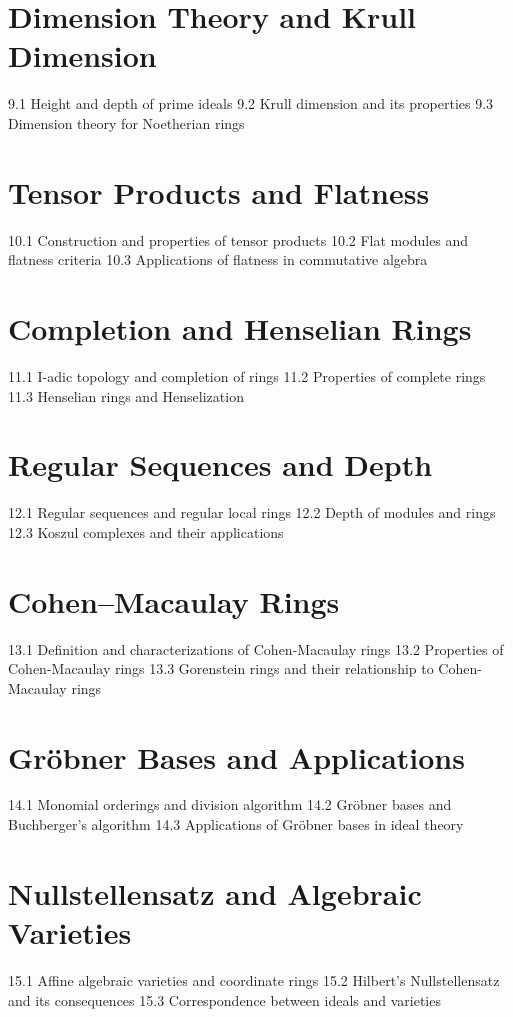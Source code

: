 \section{Dimension Theory and Krull Dimension}
9.1 Height and depth of prime ideals
9.2 Krull dimension and its properties
9.3 Dimension theory for Noetherian rings
\section{Tensor Products and Flatness}
10.1 Construction and properties of tensor products
10.2 Flat modules and flatness criteria
10.3 Applications of flatness in commutative algebra
\section{Completion and Henselian Rings}
11.1 I-adic topology and completion of rings
11.2 Properties of complete rings
11.3 Henselian rings and Henselization
\section{Regular Sequences and Depth}
12.1 Regular sequences and regular local rings
12.2 Depth of modules and rings
12.3 Koszul complexes and their applications
\section{Cohen–Macaulay Rings}
13.1 Definition and characterizations of Cohen-Macaulay rings
13.2 Properties of Cohen-Macaulay rings
13.3 Gorenstein rings and their relationship to Cohen-Macaulay rings
\section{Gröbner Bases and Applications}
14.1 Monomial orderings and division algorithm
14.2 Gröbner bases and Buchberger's algorithm
14.3 Applications of Gröbner bases in ideal theory
\section{Nullstellensatz and Algebraic Varieties}
15.1 Affine algebraic varieties and coordinate rings
15.2 Hilbert's Nullstellensatz and its consequences
15.3 Correspondence between ideals and varieties
